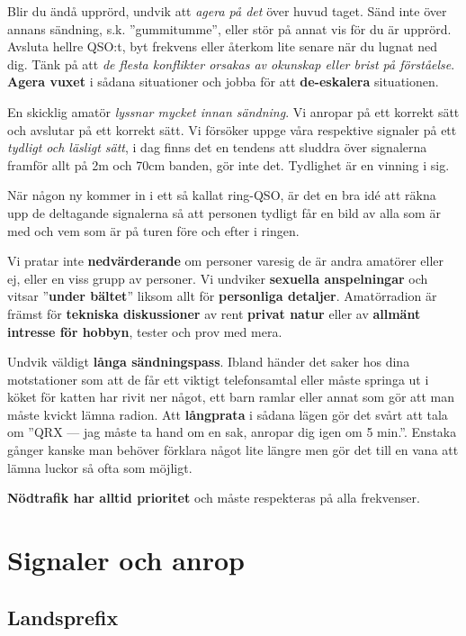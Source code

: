 Blir du ändå upprörd, undvik att \emph{agera på det} över huvud taget. Sänd
inte över annans sändning, s.k. ''gummitumme'', eller stör på annat vis för du
är upprörd. Avsluta hellre QSO:t, byt frekvens eller återkom lite senare när
du lugnat ned dig. Tänk på att \textit{de flesta konflikter orsakas av
okunskap eller brist på förståelse}. \textbf{Agera vuxet} i sådana situationer
och jobba för att \textbf{de-eskalera} situationen.

En skicklig amatör \textit{lyssnar mycket innan sändning}. Vi anropar på ett
korrekt sätt och avslutar på ett korrekt sätt. Vi försöker uppge våra
respektive signaler på ett \emph{tydligt och läsligt sätt}, i dag finns det en
tendens att sluddra över signalerna framför allt på 2m och 70cm banden, gör
inte det. Tydlighet är en vinning i sig.

När någon ny kommer in i ett så kallat ring-QSO, är det en bra idé att räkna
upp de deltagande signalerna så att personen tydligt får en bild av alla som
är med och vem som är på turen före och efter i ringen.

Vi pratar inte \textbf{nedvärderande} om personer varesig de är andra amatörer
eller ej, eller en viss grupp av personer. Vi undviker \textbf{sexuella
anspelningar} och vitsar ''\textbf{under bältet}'' liksom allt för
\textbf{personliga detaljer}. Amatörradion är främst för \textbf{tekniska
diskussioner} av rent \textbf{privat natur} eller av \textbf{allmänt intresse
för hobbyn}, tester och prov med mera.

Undvik väldigt \textbf{långa sändningspass}. Ibland händer det saker hos dina
motstationer som att de får ett viktigt telefonsamtal eller måste springa ut i
köket för katten har rivit ner något, ett barn ramlar eller annat som gör att
man måste kvickt lämna radion. Att \textbf{långprata} i sådana lägen gör det
svårt att tala om ''QRX --- jag måste ta hand om en sak, anropar dig igen om 5
min.''. Enstaka gånger kanske man behöver förklara något lite längre men gör det
till en vana att lämna luckor så ofta som möjligt.

\textbf{Nödtrafik har alltid prioritet} och måste respekteras på alla
frekvenser.

\clearpage

\section{Signaler och anrop}

\subsection{Landsprefix}


